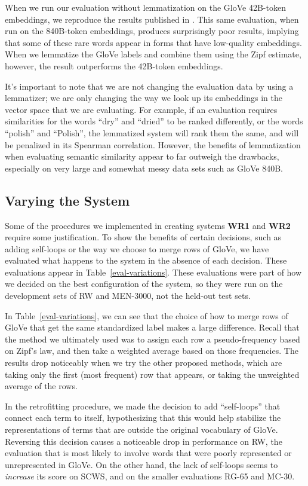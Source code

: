 \documentclass[11pt,letterpaper]{article}
\begin{document}
When we run our evaluation without lemmatization on the GloVe 42B-token
embeddings, we reproduce the results published in \cite{pennington2014glove}.
This same evaluation, when run on the 840B-token embeddings, produces
surprisingly poor results, implying that some of these rare words appear in
forms that have low-quality embeddings. When we lemmatize the GloVe labels and
combine them using the Zipf estimate, however, the result outperforms the
42B-token embeddings.

It's important to note that we are not changing the evaluation data by using
a lemmatizer; we are only changing the way we look up its embeddings in the
vector space that we are evaluating. For example, if an evaluation requires
similarities for the words ``dry'' and ``dried'' to be ranked differently, or
the words ``polish'' and ``Polish'', the lemmatized system will rank them the
same, and will be penalized in its Spearman correlation.
However, the benefits of lemmatization when evaluating semantic similarity
appear to far outweigh the drawbacks, especially on very large and somewhat
messy data sets such as GloVe 840B.

\subsection{Varying the System}

Some of the procedures we implemented in creating systems {\bf WR1} and
{\bf WR2} require some justification. To show the benefits of certain decisions,
such as adding self-loops or the way we choose to merge rows of GloVe, we have
evaluated what happens to the system in the absence of each decision. These
evaluations appear in Table~\ref{eval-variations}. These evaluations were
part of how we decided on the best configuration of the system, so they were
run on the development sets of RW and MEN-3000, not the held-out test sets.

In Table~\ref{eval-variations}, we can see that the choice of how to merge rows
of GloVe that get the same standardized label makes a large difference.  Recall
that the method we ultimately used was to assign each row a pseudo-frequency
based on Zipf's law, and then take a weighted average based on those
frequencies.  The results drop noticeably when we try the other proposed
methods, which are taking only the first (most frequent) row that appears, or
taking the unweighted average of the rows.

In the retrofitting procedure, we made the decision to add ``self-loops'' that
connect each term to itself, hypothesizing that this would help stabilize the
representations of terms that are outside the original vocabulary of GloVe.
Reversing this decision causes a noticeable drop in performance on RW, the
evaluation that is most likely to involve words that were poorly represented or
unrepresented in GloVe. On the other hand, the lack of self-loops seems to {\em
increase} its score on SCWS, and on the smaller evaluations RG-65 and MC-30.
\end{document}
